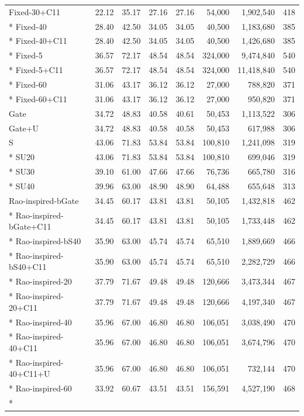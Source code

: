 \begin{small}
\begin{longtable}{lrrrrrrr}
Fixed-30+C11 & 22.12 & 35.17 & 27.16 & 27.16 & 54,000 & 1,902,540 & 418 \\*
Fixed-40 & 28.40 & 42.50 & 34.05 & 34.05 & 40,500 & 1,183,680 & 385 \\*
Fixed-40+C11 & 28.40 & 42.50 & 34.05 & 34.05 & 40,500 & 1,426,680 & 385 \\*
Fixed-5 & 36.57 & 72.17 & 48.54 & 48.54 & 324,000 & 9,474,840 & 540 \\*
Fixed-5+C11 & 36.57 & 72.17 & 48.54 & 48.54 & 324,000 & 11,418,840 & 540 \\*
Fixed-60 & 31.06 & 43.17 & 36.12 & 36.12 & 27,000 & 788,820 & 371 \\*
Fixed-60+C11 & 31.06 & 43.17 & 36.12 & 36.12 & 27,000 & 950,820 & 371 \\
Gate & 34.72 & 48.83 & 40.58 & 40.61 & 50,453 & 1,113,522 & 306 \\
Gate+U & 34.72 & 48.83 & 40.58 & 40.58 & 50,453 & 617,988 & 306 \\
S & 43.06 & 71.83 & 53.84 & 53.84 & 100,810 & 1,241,098 & 319 \\*
SU20 & 43.06 & 71.83 & 53.84 & 53.84 & 100,810 & 699,046 & 319 \\*
SU30 & 39.10 & 61.00 & 47.66 & 47.66 & 76,736 & 665,780 & 316 \\*
SU40 & 39.96 & 63.00 & 48.90 & 48.90 & 64,488 & 655,648 & 313 \\
Rao-inspired-bGate & 34.45 & 60.17 & 43.81 & 43.81 & 50,105 & 1,432,818 & 462 \\*
Rao-inspired-bGate+C11 & 34.45 & 60.17 & 43.81 & 43.81 & 50,105 & 1,733,448 & 462 \\*
Rao-inspired-bS40 & 35.90 & 63.00 & 45.74 & 45.74 & 65,510 & 1,889,669 & 466 \\*
Rao-inspired-bS40+C11 & 35.90 & 63.00 & 45.74 & 45.74 & 65,510 & 2,282,729 & 466 \\*
Rao-inspired-20 & 37.79 & 71.67 & 49.48 & 49.48 & 120,666 & 3,473,344 & 467 \\*
Rao-inspired-20+C11 & 37.79 & 71.67 & 49.48 & 49.48 & 120,666 & 4,197,340 & 467 \\*
Rao-inspired-40 & 35.96 & 67.00 & 46.80 & 46.80 & 106,051 & 3,038,490 & 470 \\*
Rao-inspired-40+C11 & 35.96 & 67.00 & 46.80 & 46.80 & 106,051 & 3,674,796 & 470 \\*
Rao-inspired-40+C11+U & 35.96 & 67.00 & 46.80 & 46.80 & 106,051 & 732,144 & 470 \\*
Rao-inspired-60 & 33.92 & 60.67 & 43.51 & 43.51 & 156,591 & 4,527,190 & 468 \\*

\end{longtable}
\end{small}
